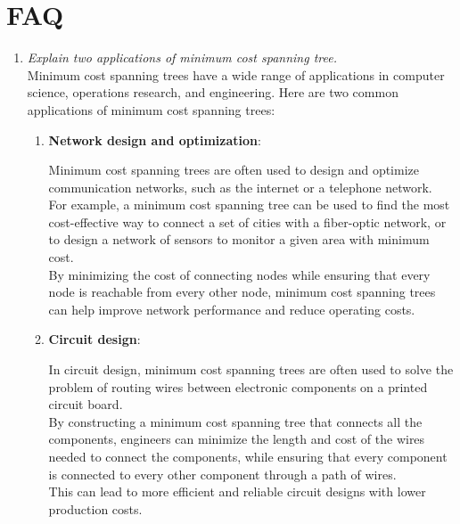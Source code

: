\documentclass[11pt]{article}
\begin{document}
\section{FAQ}
\begin{enumerate}
    \item \textit{ Explain two applications of minimum cost spanning tree.}\\
    
          Minimum cost spanning trees have a wide range of applications in computer science, operations research, and engineering. Here are two common applications of minimum cost spanning trees:

          \begin{enumerate}
              \item \textbf{Network design and optimization}:
              
              
              Minimum cost spanning trees are often used to design and optimize communication networks, such as the internet or a telephone network. \\
              
              For example, a minimum cost spanning tree can be used to find the most cost-effective way to connect a set of cities with a fiber-optic network, or to design a network of sensors to monitor a given area with minimum cost. \\
              
              By minimizing the cost of connecting nodes while ensuring that every node is reachable from every other node, minimum cost spanning trees can help improve network performance and reduce operating costs.

              \item \textbf{Circuit design}: 
              
              In circuit design, minimum cost spanning trees are often used to solve the problem of routing wires between electronic components on a printed circuit board.\\
              
              By constructing a minimum cost spanning tree that connects all the components, engineers can minimize the length and cost of the wires needed to connect the components, while ensuring that every component is connected to every other component through a path of wires. \\
              
              This can lead to more efficient and reliable circuit designs with lower production costs.


\end{enumerate}
\end{enumerate}
\end{document}
